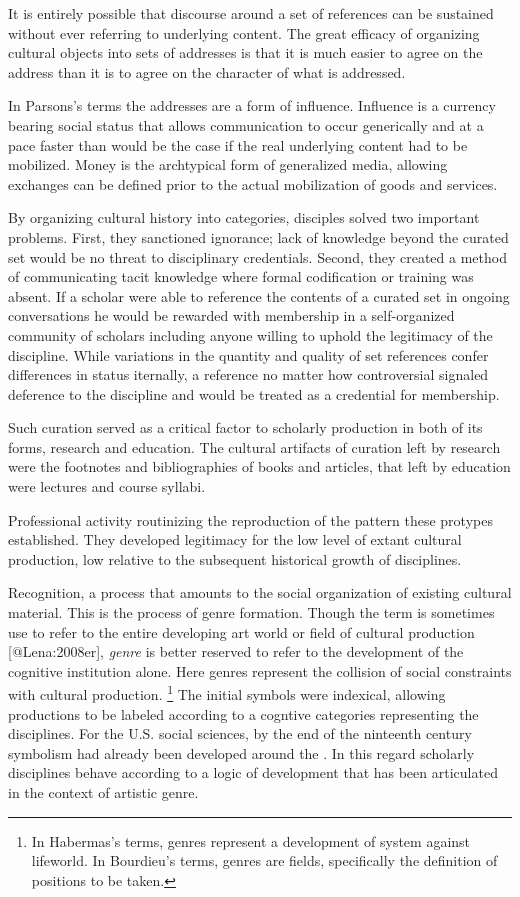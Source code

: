 \documentclass[]{article}
\let\rmarkdownfootnote\footnote%
\def\footnote{\protect\rmarkdownfootnote}
\begin{document}
It is entirely possible that discourse around a set of references can be
sustained without ever referring to underlying content. The great
efficacy of organizing cultural objects into sets of addresses is that
it is much easier to agree on the address than it is to agree on the
character of what is addressed.

In Parsons's terms the addresses are a form of influence. Influence is a
currency bearing social status that allows communication to occur
generically and at a pace faster than would be the case if the real
underlying content had to be mobilized. Money is the archtypical form of
generalized media, allowing exchanges can be defined prior to the actual
mobilization of goods and services.

By organizing cultural history into categories, disciples solved two
important problems. First, they sanctioned ignorance; lack of knowledge
beyond the curated set would be no threat to disciplinary credentials.
Second, they created a method of communicating tacit knowledge where
formal codification or training was absent. If a scholar were able to
reference the contents of a curated set in ongoing conversations he
would be rewarded with membership in a self-organized community of
scholars including anyone willing to uphold the legitimacy of the
discipline. While variations in the quantity and quality of set
references confer differences in status iternally, a reference no matter
how controversial signaled deference to the discipline and would be
treated as a credential for membership.

Such curation served as a critical factor to scholarly production in
both of its forms, research and education. The cultural artifacts of
curation left by research were the footnotes and bibliographies of books
and articles, that left by education were lectures and course syllabi.

Professional activity routinizing the reproduction of the pattern these
protypes established. They developed legitimacy for the low level of
extant cultural production, low relative to the subsequent historical
growth of disciplines.

Recognition, a process that amounts to the social organization of
existing cultural material. This is the process of genre formation.
Though the term is sometimes use to refer to the entire developing art
world or field of cultural production {[}@Lena:2008er{]}, \emph{genre}
is better reserved to refer to the development of the cognitive
institution alone. Here genres represent the collision of social
constraints with cultural production. \footnote{In Habermas's terms,
  genres represent a development of system against lifeworld. In
  Bourdieu's terms, genres are fields, specifically the definition of
  positions to be taken.} The initial symbols were indexical, allowing
productions to be labeled according to a cogntive categories
representing the disciplines. For the U.S. social sciences, by the end
of the ninteenth century symbolism had already been developed around the
. In this regard scholarly disciplines behave according to a logic of
development that has been articulated in the context of artistic genre.
\end{document}
